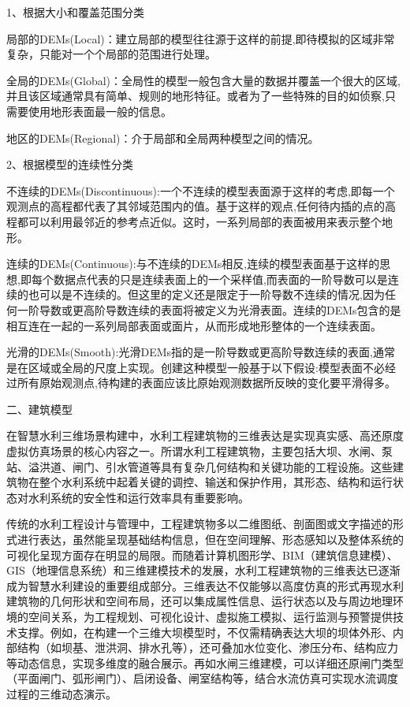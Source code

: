1、根据大小和覆盖范围分类

局部的DEMs(Local)：建立局部的模型往往源于这样的前提,即待模拟的区域非常复杂，只能对一个个局部的范围进行处理。

全局的DEMs(Global)：全局性的模型一般包含大量的数据并覆盖一个很大的区域,并且该区域通常具有简单、规则的地形特征。或者为了一些特殊的目的如侦察,只需要使用地形表面最一般的信息。

地区的DEMs(Regional)：介于局部和全局两种模型之间的情况。

2、根据模型的连续性分类

不连续的DEMs(Discontinuous):一个不连续的模型表面源于这样的考虑,即每一个观测点的高程都代表了其邻域范围内的值。基于这样的观点,任何待内插的点的高程都可以利用最邻近的参考点近似。这时，一系列局部的表面被用来表示整个地形。

连续的DEMs(Continuous):与不连续的DEMs相反,连续的模型表面基于这样的思想,即每个数据点代表的只是连续表面上的一个采样值,而表面的一阶导数可以是连续的也可以是不连续的。但这里的定义还是限定于一阶导数不连续的情况,因为任何一阶导数或更高阶导数连续的表面将被定义为光滑表面。连续的DEMs包含的是相互连在一起的一系列局部表面或面片，从而形成地形整体的一个连续表面。

光滑的DEMs(Smooth):光滑DEMs指的是一阶导数或更高阶导数连续的表面,通常是在区域或全局的尺度上实现。创建这种模型一般基于以下假设:模型表面不必经过所有原始观测点,待构建的表面应该比原始观测数据所反映的变化要平滑得多。

二、建筑模型

在智慧水利三维场景构建中，水利工程建筑物的三维表达是实现真实感、高还原度虚拟仿真场景的核心内容之一。所谓水利工程建筑物，主要包括大坝、水闸、泵站、溢洪道、闸门、引水管道等具有复杂几何结构和关键功能的工程设施。这些建筑物在整个水利系统中起着关键的调控、输送和保护作用，其形态、结构和运行状态对水利系统的安全性和运行效率具有重要影响。

传统的水利工程设计与管理中，工程建筑物多以二维图纸、剖面图或文字描述的形式进行表达，虽然能呈现基础结构信息，但在空间理解、形态感知以及整体系统的可视化呈现方面存在明显的局限。而随着计算机图形学、BIM（建筑信息建模）、GIS（地理信息系统）和三维建模技术的发展，水利工程建筑物的三维表达已逐渐成为智慧水利建设的重要组成部分。三维表达不仅能够以高度仿真的形式再现水利建筑物的几何形状和空间布局，还可以集成属性信息、运行状态以及与周边地理环境的空间关系，为工程规划、可视化设计、虚拟施工模拟、运行监测与预警提供技术支撑。例如，在构建一个三维大坝模型时，不仅需精确表达大坝的坝体外形、内部结构（如坝基、泄洪洞、排水孔等），还可叠加水位变化、渗压分布、结构应力等动态信息，实现多维度的融合展示。再如水闸三维建模，可以详细还原闸门类型（平面闸门、弧形闸门）、启闭设备、闸室结构等，结合水流仿真可实现水流调度过程的三维动态演示。


